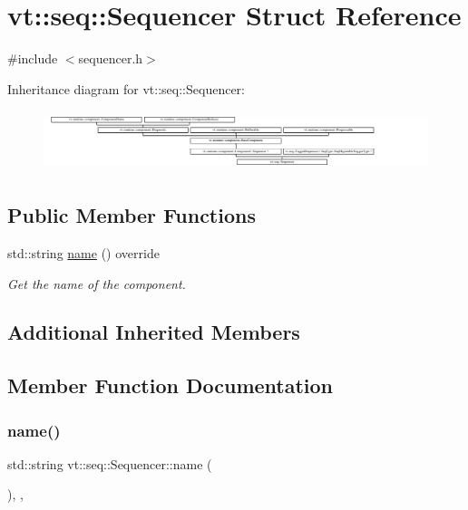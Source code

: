 \hypertarget{structvt_1_1seq_1_1_sequencer}{}\section{vt\+:\+:seq\+:\+:Sequencer Struct Reference}
\label{structvt_1_1seq_1_1_sequencer}


{\ttfamily \#include $<$sequencer.\+h$>$}

Inheritance diagram for vt\+:\+:seq\+:\+:Sequencer\+:\begin{figure}[H]
\begin{center}
\leavevmode
\includegraphics[height=1.767677cm]{structvt_1_1seq_1_1_sequencer}
\end{center}
\end{figure}
\subsection*{Public Member Functions}
\begin{DoxyCompactItemize}
\item 
std\+::string \hyperlink{structvt_1_1seq_1_1_sequencer_a18cbaabd9f1c5bf8d2f6a5c2e4ac5aaa}{name} () override
\begin{DoxyCompactList}\small\item\em Get the name of the component. \end{DoxyCompactList}\end{DoxyCompactItemize}
\subsection*{Additional Inherited Members}


\subsection{Member Function Documentation}
\mbox{\label{structvt_1_1seq_1_1_sequencer_a18cbaabd9f1c5bf8d2f6a5c2e4ac5aaa}} 
\subsubsection{\texorpdfstring{name()}{name()}}
{\footnotesize\ttfamily std\+::string vt\+::seq\+::\+Sequencer\+::name (\begin{DoxyParamCaption}{ }\end{DoxyParamCaption})\hspace{0.3cm}{\ttfamily [inline]}, {\ttfamily [override]}, {\ttfamily [virtual]}}



